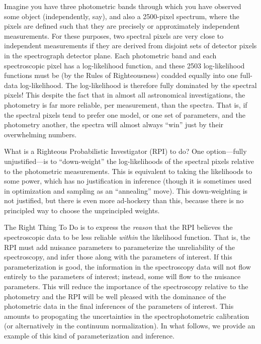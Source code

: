 \documentclass[iop,numberedappendix]{emulateapj}
\begin{document}
Imagine you have three photometric bands through which you have
observed some object (independently, say), and also a 2500-pixel
spectrum, where the pixels are defined such that they are precisely or
approximately independent measurements.
For these purposes, two spectral pixels are very close to independent
measurements if they are derived from disjoint sets of detector pixels
in the spectrograph detector plane.
Each photometric band and each spectroscopic pixel has a
log-likelihood function, and these 2503 log-likelihood functions must
be (by the Rules of Righteousness) coadded equally into one full-data
log-likelihood.
The log-likelihood is therefore fully dominated by the spectral
pixels!
This despite the fact that in almost all astronomical investigations,
the photometry is far more reliable, per measurement, than the
spectra.
That is, if the spectral pixels tend to prefer one model, or one set
of parameters, and the photometry another, the spectra will almost
always ``win'' just by their overwhelming numbers.

What is a Righteous Probabilistic Investigator (RPI) to do?
One option---fully unjustified---is to ``down-weight'' the
log-likelihoods of the spectral pixels relative to the photometric
measurements.
This is equivalent to taking the likelihoods to some power, which has
no justification in inference (though it is sometimes used in
optimization and sampling as an ``annealing'' move).
This down-weighting is not justified, but there is even more
ad-hockery than this, because there is no principled way to choose the
unprincipled weights.

The Right Thing To Do is to express the \emph{reason} that the RPI
believes the spectroscopic data to be less reliable \emph{within} the
likelihood function.
That is, the RPI must add nuisance parameters to parameterize the
unreliability of the spectroscopy, and infer those along with the
parameters of interest.
If this parameterization is good, the information in the spectroscopy
data will not flow entirely to the parameters of interest; instead,
some will flow to the nuisance parameters.
This will reduce the importance of the spectroscopy relative to the
photometry and the RPI will be well pleased with the dominance of the
photometric data in the final inferences of the parameters of
interest.
This amounts to propogating the uncertainties in the
spectrophotometric calibration (or alternatively in the continuum
normalization).
In what follows, we provide an example of this kind of
parameterization and inference.
\end{document}
